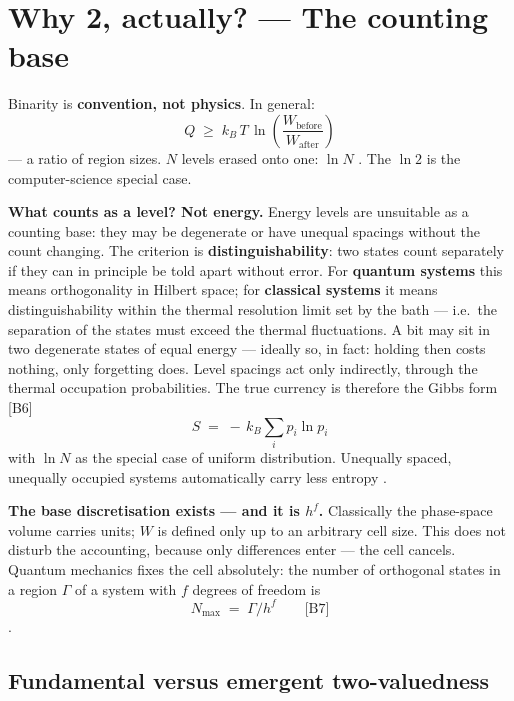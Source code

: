 \section{Why 2, actually? --- The counting base}
\label{sec:counting}

Binarity is \textbf{convention, not physics}. In general:
\[
  Q \;\ge\; k_B\,T\,\ln\!\left(\frac{W_{\text{before}}}{W_{\text{after}}}\right)
\]
--- a ratio of region sizes. $N$ levels erased onto one: $\ln N$
. The $\ln 2$ is the computer-science special case.

\LB \textbf{What counts as a level? Not energy.} Energy levels are unsuitable as a
counting base: they may be degenerate or have unequal spacings without the count
changing. The criterion is \textbf{distinguishability}: two states count
separately if they can in principle be told apart without error. For
\textbf{quantum systems} this means orthogonality in Hilbert space; for
\textbf{classical systems} it means distinguishability within the thermal
resolution limit set by the bath --- i.e.\ the separation of the states must
exceed the thermal fluctuations. A bit may sit in two degenerate states of equal
energy --- ideally so, in fact: holding then costs nothing, only forgetting does.
Level spacings act only indirectly, through the thermal occupation probabilities.
The true currency is therefore the Gibbs form [B6]
\[
  S \;=\; -\,k_B \sum_i p_i \ln p_i
\]
with $\ln N$ as the special case of uniform distribution. Unequally spaced,
unequally occupied systems automatically carry less entropy .

\LB \textbf{The base discretisation exists --- and it is $h^f$.} Classically the
phase-space volume carries units; $W$ is defined only up to an arbitrary cell
size. This does not disturb the accounting, because only differences enter --- the
cell cancels. Quantum mechanics fixes the cell absolutely: the number of
orthogonal states in a region $\Gamma$ of a system with $f$ degrees of freedom is
\[
  N_{\max} \;=\; \Gamma / h^f \qquad \text{[B7]}
\]
.

\subsection{Fundamental versus emergent two-valuedness}

